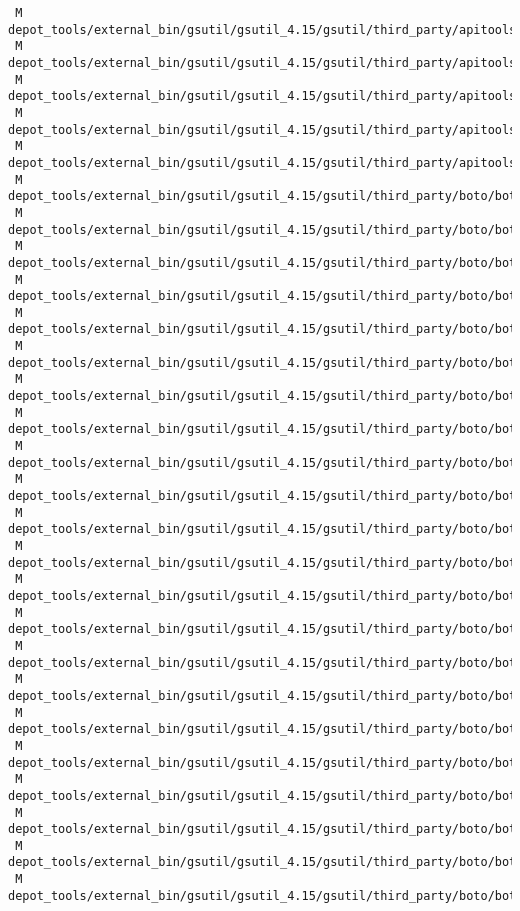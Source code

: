 \documentclass{article}
\begin{document}
\begin{verbatim}
 M depot_tools/external_bin/gsutil/gsutil_4.15/gsutil/third_party/apitools/samples/storage_sample/downloads_test.py
 M depot_tools/external_bin/gsutil/gsutil_4.15/gsutil/third_party/apitools/samples/storage_sample/storage/__init__.py
 M depot_tools/external_bin/gsutil/gsutil_4.15/gsutil/third_party/apitools/samples/storage_sample/storage/storage_v1.py
 M depot_tools/external_bin/gsutil/gsutil_4.15/gsutil/third_party/apitools/samples/storage_sample/storage/storage_v1_client.py
 M depot_tools/external_bin/gsutil/gsutil_4.15/gsutil/third_party/apitools/samples/storage_sample/storage/storage_v1_messages.py
 M depot_tools/external_bin/gsutil/gsutil_4.15/gsutil/third_party/boto/boto/auth.py
 M depot_tools/external_bin/gsutil/gsutil_4.15/gsutil/third_party/boto/boto/cloudfront/__init__.py
 M depot_tools/external_bin/gsutil/gsutil_4.15/gsutil/third_party/boto/boto/cloudsearch/search.py
 M depot_tools/external_bin/gsutil/gsutil_4.15/gsutil/third_party/boto/boto/cloudsearch2/layer1.py
 M depot_tools/external_bin/gsutil/gsutil_4.15/gsutil/third_party/boto/boto/cloudsearch2/search.py
 M depot_tools/external_bin/gsutil/gsutil_4.15/gsutil/third_party/boto/boto/compat.py
 M depot_tools/external_bin/gsutil/gsutil_4.15/gsutil/third_party/boto/boto/connection.py
 M depot_tools/external_bin/gsutil/gsutil_4.15/gsutil/third_party/boto/boto/dynamodb/item.py
 M depot_tools/external_bin/gsutil/gsutil_4.15/gsutil/third_party/boto/boto/dynamodb/table.py
 M depot_tools/external_bin/gsutil/gsutil_4.15/gsutil/third_party/boto/boto/dynamodb/types.py
 M depot_tools/external_bin/gsutil/gsutil_4.15/gsutil/third_party/boto/boto/dynamodb2/items.py
 M depot_tools/external_bin/gsutil/gsutil_4.15/gsutil/third_party/boto/boto/dynamodb2/table.py
 M depot_tools/external_bin/gsutil/gsutil_4.15/gsutil/third_party/boto/boto/ec2/buyreservation.py
 M depot_tools/external_bin/gsutil/gsutil_4.15/gsutil/third_party/boto/boto/ec2/cloudwatch/__init__.py
 M depot_tools/external_bin/gsutil/gsutil_4.15/gsutil/third_party/boto/boto/ec2/ec2object.py
 M depot_tools/external_bin/gsutil/gsutil_4.15/gsutil/third_party/boto/boto/ec2/reservedinstance.py
 M depot_tools/external_bin/gsutil/gsutil_4.15/gsutil/third_party/boto/boto/ecs/__init__.py
 M depot_tools/external_bin/gsutil/gsutil_4.15/gsutil/third_party/boto/boto/emr/connection.py
 M depot_tools/external_bin/gsutil/gsutil_4.15/gsutil/third_party/boto/boto/exception.py
 M depot_tools/external_bin/gsutil/gsutil_4.15/gsutil/third_party/boto/boto/fps/connection.py
 M depot_tools/external_bin/gsutil/gsutil_4.15/gsutil/third_party/boto/boto/fps/response.py
 M depot_tools/external_bin/gsutil/gsutil_4.15/gsutil/third_party/boto/boto/glacier/layer1.py

\end{verbatim}
\end{document}
